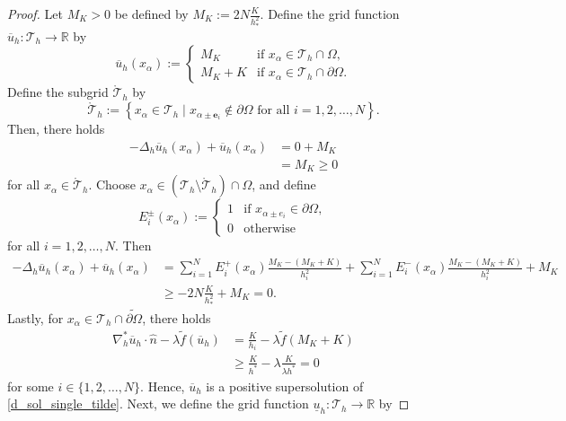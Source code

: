 \documentclass[12pt, reqno]{amsart}
\numberwithin{equation}{section}
\begin{document}
\begin{proof}
Let $M_K > 0$ be defined by $M_K := 2 N \frac{K}{h_*^2}$.  
Define the grid function $\overline{u}_h : \mathcal{T}_h \to \mathbb{R}$ by 
\begin{equation}
    \overline{u}_h(x_\alpha) := 
    \begin{cases}
        M_K & \text{if } x_\alpha \in \mathcal{T}_h \cap \Omega , \\ 
        M_K + K & \text{if } x_\alpha \in \mathcal{T}_h \cap \partial \Omega . 
    \end{cases}
\end{equation}
Define the subgrid $\mathring{\mathcal{T}}_h$ by 
\[
    \mathring{\mathcal{T}}_h := \left\{ x_\alpha \in \mathcal{T}_h \mid 
    x_{\alpha \pm \mathbf{e}_i} \notin \partial \Omega \text{ for all } i=1,2,\ldots,N \right\} . 
\]
Then, there holds 
\begin{align*}
    -\Delta_h \overline{u}_h(x_\alpha) + \overline{u}_h(x_\alpha) 
    & = 0 + M_K \\ 
    & = M_K \geq 0 
\end{align*}
for all $x_\alpha \in \mathring{\mathcal{T}}_h$.  
Choose $x_\alpha \in (\mathcal{T}_h \setminus \mathring{\mathcal{T}}_h) \cap \Omega$, 
and define 
\[
    E_i^\pm (x_\alpha) := 
    \begin{cases}
        1 & \text{if } x_{\alpha \pm {e}_i} \in \partial \Omega , \\ 
        0 & \text{otherwise} 
    \end{cases}
\]
for all $i = 1,2,\ldots,N$.  
Then 
\begin{align*}
    -\Delta_h \overline{u}_h(x_\alpha) + \overline{u}_h(x_\alpha)
    & = \sum_{i=1}^N E_i^+(x_\alpha) \frac{M_K - (M_K+K)}{h_i^2} + \sum_{i=1}^N E_i^-(x_\alpha) \frac{M_K - (M_K+K)}{h_i^2} 
        + M_K \\ 
    & \geq - 2N \frac{K}{h_*^2} + M_K = 0 . 
\end{align*}
Lastly, for $x_\alpha \in \mathcal{T}_h \cap \widetilde{\partial \Omega}$, there holds 
\begin{align*}
    \nabla_h^* \overline{u}_{h}  \cdot \widehat{n} - \lambda \widetilde{f}(\overline{u}_{h})
    & = \frac{K}{h_i} - \lambda \widetilde{f}(M_K+K) \\ 
    & \geq \frac{K}{h^*} - \lambda \frac{K}{\lambda h^*} = 0  
\end{align*}
for some $i \in \{1,2,\ldots,N\}$.  
Hence, $\overline{u}_h$ is a positive supersolution of \eqref{d_sol_single_tilde}.  
Next, we define the grid function $\underline{u}_h : \mathcal{T}_h \to \mathbb{R}$ by 

\end{proof}
\end{document}

